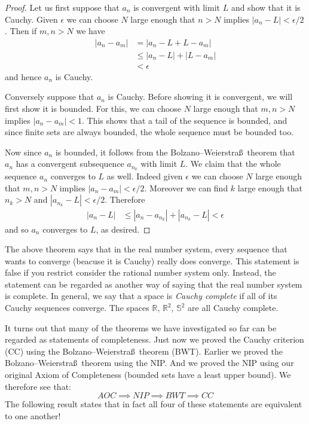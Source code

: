 \documentclass[11pt,oneside]{amsbook}
\newcommand{\R}{\mathbb R}
\theoremstyle{definition}
\theoremstyle{plain}
\theoremstyle{definition}
\theoremstyle{remark}
\numberwithin{equation}{section}
\numberwithin{figure}{section}
\begin{document}
\begin{proof}
  Let us first suppose that $a_n$ is convergent with limit $L$ and show that it is Cauchy. Given $\epsilon$ we can choose $N$ large enough that $n>N$ implies $|a_n-L|<\epsilon/2$. Then if $m,n>N$ we have
  \begin{align*}
    |a_n-a_m|&= |a_n-L+L-a_m|\\
             &\leq |a_n-L|+|L-a_m|\\
             &<\epsilon
  \end{align*}
  and hence $a_n$ is Cauchy.
  
  Conversely suppose that $a_n$ is Cauchy. Before showing it is convergent, we will first show it is bounded. For this, we can choose $N$ large enough that $m,n>N$ implies $|a_n-a_m|<1$. This shows that a tail of the sequence is bounded, and since finite sets are always bounded, the whole sequence must be bounded too.

  Now since $a_n$ is bounded, it follows from the Bolzano--Weierstra\ss\ theorem that $a_n$ has a convergent subsequence $a_{n_k}$ with limit $L$. We claim that the whole sequence $a_n$ converges to $L$ as well. Indeed given $\epsilon$ we can choose $N$ large enough that $m,n>N$ implies $|a_n-a_m|<\epsilon/2$. Moreover we can find $k$ large enough that $n_k>N$ and $|a_{n_k}-L|<\epsilon/2$. Therefore
  \begin{align*}
    |a_n-L|&\leq|a_n-a_{n_k}|+|a_{n_k}-L|<\epsilon
  \end{align*}
  and so $a_n$ converges to $L$, as desired.
\end{proof}

The above theorem says that in the real number system, every sequence that wants to converge (beacuse it is Cauchy) really does converge. This statement is false if you restrict consider the rational number system only. Instead, the statement can be regarded as another way of saying that the real number system is complete. In general, we say that a space is \emph{Cauchy complete} if all of its Cauchy sequences converge. The spaces $\R$, $\R^2$, $\mathbb S^2$ are all Cauchy complete.

It turns out that many of the theorems we have investigated so far can be regarded as statements of completeness. Just now we proved the Cauchy criterion (CC) using the Bolzano--Weierstra\ss\ theorem (BWT). Earlier we proved the Bolzano--Weierstra\ss\ theorem using the NIP. And we proved the NIP using our original Axiom of Completeness (bounded sets have a least upper bound). We therefore see that:
\[AOC\implies NIP\implies BWT\implies CC
\]
The following result states that in fact all four of these statements are equivalent to one another!
\end{document}
